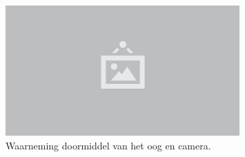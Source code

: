 \begin{figure}
  \centering
  \includegraphics[width=0.8\textwidth]{./img/raw/placeholder.png}
  \caption{Waarneming doormiddel van het oog en camera.}
  \label{fig:fw-waarneming}
\end{figure}
